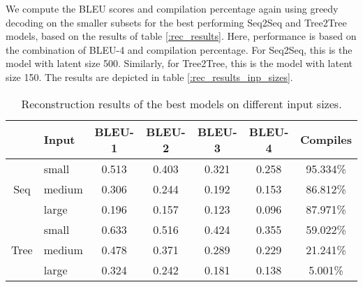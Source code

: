  

We compute the BLEU scores and compilation percentage again using greedy decoding on the smaller subsets for the best performing Seq2Seq and Tree2Tree models, based on the results of table \ref{:rec_results}. Here, performance is based on the combination of BLEU-4 and compilation percentage. For Seq2Seq, this is the model with latent size 500. Similarly, for Tree2Tree, this is the model with latent size 150. The results are depicted in table \ref{:rec_results_inp_sizes}.






\begin{table}[ht!]
\centering
\begingroup
\setlength{\tabcolsep}{3pt} %
\renewcommand{\arraystretch}{1.4} %
\begin{tabular}{clccccc}
 & \textbf{Input} & \textbf{BLEU-1} & \textbf{BLEU-2} & \textbf{BLEU-3} & \textbf{BLEU-4} & \textbf{Compiles}\\ \hline
\multirow{3}{*}{Seq}    &   small   &   0.513  &    0.403    &      0.321    &  0.258      &  95.334\%     \\
                            &   medium   &  0.306      &    0.244        &      0.192     & 0.153      & 86.812\% \\
                            &   large   &    0.196   &      0.157   &   0.123       &   0.096       &  87.971\% \\ \hline
\multirow{3}{*}{Tree}  &   small   &   0.633  &    0.516     &     0.424     &     0.355      &  59.022\%                \\
                            &   medium   &   0.478  &   0.371        &          0.289 &     0.229   & 21.241\%            \\
                            &   large   &  0.324 &      0.242  & 0.181    &    0.138     &    5.001\%         \\ 
\end{tabular}
\endgroup
\caption{Reconstruction results of the best models on different input sizes.}
\label{tab:rec_results_inp_sizes}
\end{table}



